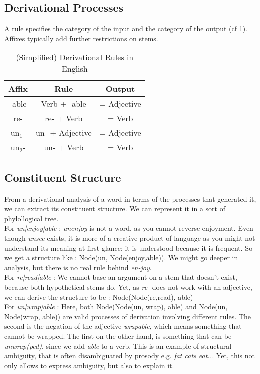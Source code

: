 \documentclass{cours}
\begin{document}
\subsection{Derivational Processes}
A rule specifies the category of the input and the category of the output (cf \ref{table:Derivational Rules in English}). Affixes typically add further restrictions on stems.

\begin{table}
    \centering
    \caption{(Simplified) Derivational Rules in English}
    \begin{tabular}{ccc}
        \toprule
        Affix &Rule &Output\\
        \midrule
        -able & Verb + -able &= Adjective\\
        re- & re- + Verb &= Verb\\
        un$_{1}$- & un- + Adjective &= Adjective\\
        un$_{2}$- & un- + Verb &= Verb\\
    \end{tabular}
    \label{table:Derivational Rules in English}
\end{table}

\subsection{Constituent Structure}
From a derivational analysis of a word in terms of the processes that generated it, we can extract its constituent structure. We can represent it in a sort of phylollogical tree. \\
For \textsl{un|enjoy|able} : \textsl{unenjoy} is not a word, as you cannot reverse enjoyment. Even though \textsl{unsee} exists, it is more of a creative product of language as you might not understand its meaning at first glance; it is understood because it is frequent. So we get a structure like : Node(un, Node(enjoy,able)). We might go deeper in analysis, but there is no real rule behind \textsl{en-joy}.\\
For \textsl{re|read|able} : We cannot base an argument on a stem that doesn't exist, because both hypothetical stems do. Yet, as \textsl{re-} does not work with an adjective, we can derive the structure to be : Node(Node(re,read), able)\\
For \textsl{un|wrap|able} : Here, both Node(Node(un, wrap), able) and Node(un, Node(wrap, able)) are valid processes of derivation involving different rules. The second is the negation of the adjective \textsl{wrapable}, which means something that cannot be wrapped. The first on the other hand, is something that can be \textsl{unwrap(ped)}, since we add \textsl{able} to a verb. This is an example of structural ambiguity, that is often disambiguated by prosody e.g. \textsl{fat cats eat...} Yet, this not only allows to express ambiguity, but also to explain it. 
\end{document}
